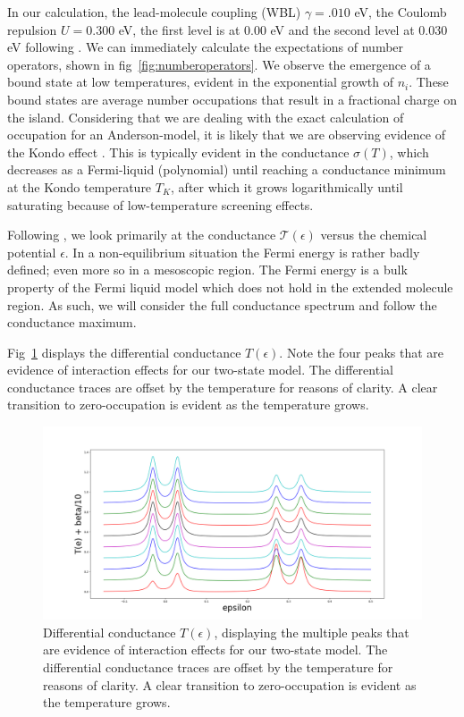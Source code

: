 \documentclass{article}
\begin{document}
\begin{multicols}{2}
        In our calculation, the lead-molecule coupling (WBL) $\gamma=.010$ eV, the Coulomb repulsion $U=0.300$ eV, the first level is at $0.00$ eV and the second level at $0.030$ eV following \cite{meir}. We can immediately calculate the expectations of number operators, shown in fig~\ref{fig:numberoperators}. We observe the emergence of a bound state at low temperatures, evident in the exponential growth of $n_i$. These bound states are average number occupations that result in a fractional charge on the island. Considering that we are dealing with the exact calculation of occupation for an Anderson-model, it is likely that we are observing evidence of the Kondo effect \cite{josherrereview}. This is typically evident in the conductance $\sigma(T)$, which decreases as a Fermi-liquid (polynomial) until reaching a conductance minimum at the Kondo temperature $T_K$, after which it grows logarithmically until saturating because of low-temperature screening effects.
        
        Following \citet{meir}, we look primarily at the conductance $\mathscr{T}(\epsilon)$ versus the chemical potential $\epsilon$. In a non-equilibrium situation the Fermi energy is rather badly defined; even more so in a mesoscopic region. The Fermi energy is a bulk property of the Fermi liquid model which does not hold in the extended molecule region. As such, we will consider the full conductance spectrum and follow the conductance maximum.
        
        Fig~\ref{fig:transplot} displays the differential conductance $T(\epsilon)$. Note the four peaks that are evidence of interaction effects for our two-state model. The differential conductance traces are offset by the temperature for reasons of clarity. A clear transition to zero-occupation is evident as the temperature grows.
        
        \begin{figure}[b]
            \centering
            \includegraphics[width=\textwidth]{fig/figure_3.png}
            \caption{\label{fig:transplot} Differential conductance $T(\epsilon)$, displaying the multiple peaks that are evidence of interaction effects for our two-state model. The differential conductance traces are offset by the temperature for reasons of clarity. A clear transition to zero-occupation is evident as the temperature grows.}
        \end{figure}
        

\end{multicols}
\end{document}
